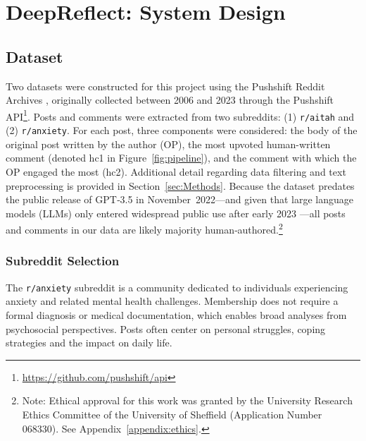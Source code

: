 \chapter{DeepReflect: System Design}\label{sec:SysDesign}
\section{Dataset}

Two datasets were constructed for this project using the Pushshift Reddit Archives \cite{pushshift}, originally collected between 2006 and 2023 through the Pushshift API\footnote{\url{https://github.com/pushshift/api}}. Posts and comments were extracted from two subreddits: (1) \texttt{r/aitah} and (2) \texttt{r/anxiety}. For each post, three components were considered: the body of the original post written by the author (OP), the most upvoted human-written comment (denoted hc1 in Figure~\ref{fig:pipeline}), and the comment with which the OP engaged the most (hc2). Additional detail regarding data filtering and text preprocessing is provided in Section~\ref{sec:Methods}. Because the dataset predates the public release of GPT‑3.5 in November 2022—and given that large language models (LLMs) only entered widespread public use after early 2023 \cite{liang2025widespread}—all posts and comments in our data are likely majority human‑authored.\footnote{Note: Ethical approval for this work was granted by the University Research Ethics Committee of the University of Sheffield (Application Number 068330). See Appendix~\ref{appendix:ethics}.}

\subsection{Subreddit Selection}

The \texttt{r/anxiety} subreddit is a community dedicated to individuals experiencing anxiety and related mental health challenges. Membership does not require a formal diagnosis or medical documentation, which enables broad analyses from psychosocial perspectives. Posts often center on personal struggles, coping strategies and the impact on daily life.

